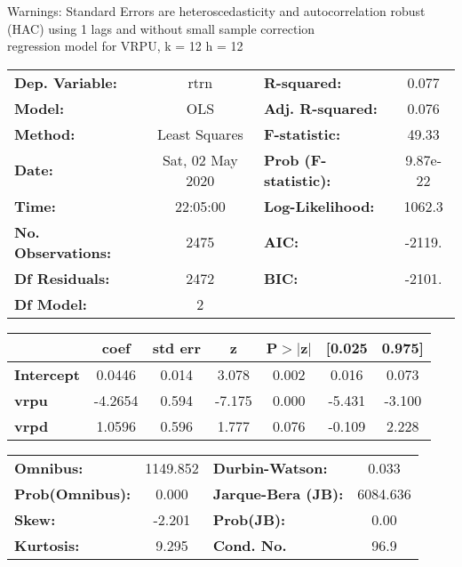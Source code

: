 Warnings: \newline
 [1] Standard Errors are heteroscedasticity and autocorrelation robust (HAC) using 1 lags and without small sample correction\\ 

regression model for VRPU, k = 12 h = 12\begin{center}
\begin{tabular}{lclc}
\toprule
\textbf{Dep. Variable:}    &       rtrn       & \textbf{  R-squared:         } &     0.077   \\
\textbf{Model:}            &       OLS        & \textbf{  Adj. R-squared:    } &     0.076   \\
\textbf{Method:}           &  Least Squares   & \textbf{  F-statistic:       } &     49.33   \\
\textbf{Date:}             & Sat, 02 May 2020 & \textbf{  Prob (F-statistic):} &  9.87e-22   \\
\textbf{Time:}             &     22:05:00     & \textbf{  Log-Likelihood:    } &    1062.3   \\
\textbf{No. Observations:} &        2475      & \textbf{  AIC:               } &    -2119.   \\
\textbf{Df Residuals:}     &        2472      & \textbf{  BIC:               } &    -2101.   \\
\textbf{Df Model:}         &           2      & \textbf{                     } &             \\
\bottomrule
\end{tabular}
\begin{tabular}{lcccccc}
                   & \textbf{coef} & \textbf{std err} & \textbf{z} & \textbf{P$> |$z$|$} & \textbf{[0.025} & \textbf{0.975]}  \\
\midrule
\textbf{Intercept} &       0.0446  &        0.014     &     3.078  &         0.002        &        0.016    &        0.073     \\
\textbf{vrpu}      &      -4.2654  &        0.594     &    -7.175  &         0.000        &       -5.431    &       -3.100     \\
\textbf{vrpd}      &       1.0596  &        0.596     &     1.777  &         0.076        &       -0.109    &        2.228     \\
\bottomrule
\end{tabular}
\begin{tabular}{lclc}
\textbf{Omnibus:}       & 1149.852 & \textbf{  Durbin-Watson:     } &    0.033  \\
\textbf{Prob(Omnibus):} &   0.000  & \textbf{  Jarque-Bera (JB):  } & 6084.636  \\
\textbf{Skew:}          &  -2.201  & \textbf{  Prob(JB):          } &     0.00  \\
\textbf{Kurtosis:}      &   9.295  & \textbf{  Cond. No.          } &     96.9  \\
\bottomrule
\end{tabular}
\end{center}

